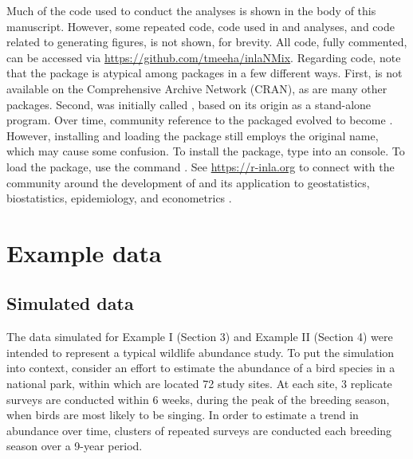 \documentclass[codesnippet]{jss}
\begin{document}
Much of the code used to conduct the  analyses is shown in the 
body of this manuscript. However, some repeated  code, code used 
in  and  analyses, and code related to 
generating figures, is not shown, for brevity. All code, fully commented, 
can be accessed via \url{https://github.com/tmeeha/inlaNMix}. Regarding 
code, note that the  package is atypical among  
packages in a few different ways.  First,  is not available on 
the Comprehensive  Archive Network (CRAN), as are many other 
 packages. Second,  was initially called , 
based on its origin as a stand-alone  program.  Over time, 
community reference to the packaged evolved to become .  
However, installing and loading the package still employs the original name, 
which may cause some confusion. To install the package, type 
 into an 
 console. To load the package, use the  command 
. See \url{https://r-inla.org} to connect with the 
community around the development of  and its application to 
geostatistics, biostatistics, epidemiology, and econometrics 
\citep{Lindgren_Rue_2015,Blangiardo_Cameletti_2015}.

\section[Example data]{Example data}
\subsection[Simulated data]{Simulated data}
The data simulated for Example I (Section 3) and Example II (Section 4) were intended to represent a typical wildlife abundance study. To put the simulation into context, consider an effort to estimate the abundance of a bird species in a national park, within which are located 72 study sites. At each site, 3 replicate surveys are conducted within 6 weeks, during the peak of the breeding season, when birds are most likely to be singing. In order to estimate a trend in abundance over time, clusters of repeated surveys are conducted each breeding season over a 9-year period.
\end{document}
